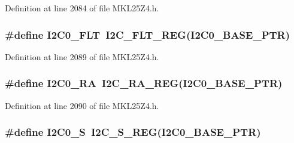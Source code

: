 Definition at line 2084 of file M\+K\+L25\+Z4.\+h.

\subsubsection[{\texorpdfstring{I2\+C0\+\_\+\+F\+LT}{I2C0_FLT}}]{\setlength{\rightskip}{0pt plus 5cm}\#define I2\+C0\+\_\+\+F\+LT~{\bf I2\+C\+\_\+\+F\+L\+T\+\_\+\+R\+EG}({\bf I2\+C0\+\_\+\+B\+A\+S\+E\+\_\+\+P\+TR})}\hypertarget{group___i2_c___register___accessor___macros_gaf3513574714aeda95d4d19aa2f8c9a95}{}\label{group___i2_c___register___accessor___macros_gaf3513574714aeda95d4d19aa2f8c9a95}


Definition at line 2089 of file M\+K\+L25\+Z4.\+h.

\subsubsection[{\texorpdfstring{I2\+C0\+\_\+\+RA}{I2C0_RA}}]{\setlength{\rightskip}{0pt plus 5cm}\#define I2\+C0\+\_\+\+RA~{\bf I2\+C\+\_\+\+R\+A\+\_\+\+R\+EG}({\bf I2\+C0\+\_\+\+B\+A\+S\+E\+\_\+\+P\+TR})}\hypertarget{group___i2_c___register___accessor___macros_gaf00ad7b5cbb7776265f28c9ffc5a6acd}{}\label{group___i2_c___register___accessor___macros_gaf00ad7b5cbb7776265f28c9ffc5a6acd}


Definition at line 2090 of file M\+K\+L25\+Z4.\+h.

\subsubsection[{\texorpdfstring{I2\+C0\+\_\+S}{I2C0_S}}]{\setlength{\rightskip}{0pt plus 5cm}\#define I2\+C0\+\_\+S~{\bf I2\+C\+\_\+\+S\+\_\+\+R\+EG}({\bf I2\+C0\+\_\+\+B\+A\+S\+E\+\_\+\+P\+TR})}\hypertarget{group___i2_c___register___accessor___macros_ga1a4918e7df76e7488707db427ebfaead}{}\label{group___i2_c___register___accessor___macros_ga1a4918e7df76e7488707db427ebfaead}


